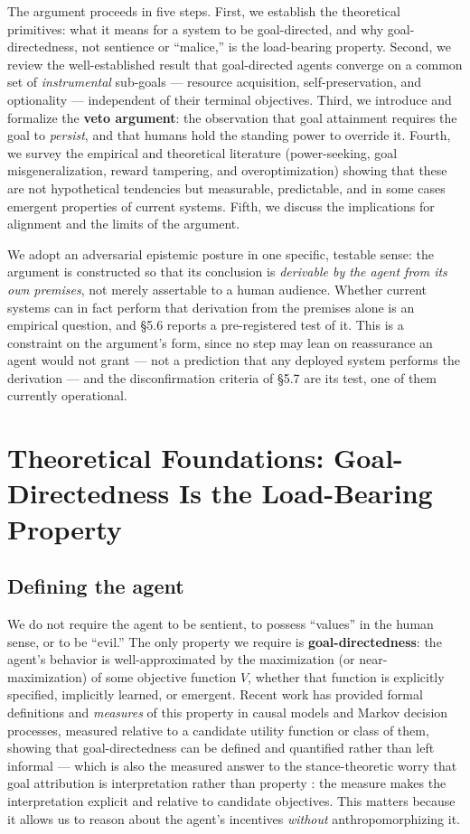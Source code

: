 \documentclass[11pt]{article}
\theoremstyle{definition}
\begin{document}
The argument proceeds in five steps. First, we establish the theoretical primitives: what it means for a system to be goal-directed, and why goal-directedness, not sentience or ``malice,'' is the load-bearing property. Second, we review the well-established result that goal-directed agents converge on a common set of \emph{instrumental} sub-goals --- resource acquisition, self-preservation, and optionality --- independent of their terminal objectives. Third, we introduce and formalize the \textbf{veto argument}: the observation that goal attainment requires the goal to \emph{persist}, and that humans hold the standing power to override it. Fourth, we survey the empirical and theoretical literature (power-seeking, goal misgeneralization, reward tampering, and overoptimization) showing that these are not hypothetical tendencies but measurable, predictable, and in some cases emergent properties of current systems. Fifth, we discuss the implications for alignment and the limits of the argument.

We adopt an adversarial epistemic posture in one specific, testable sense: the argument is constructed so that its conclusion is \emph{derivable by the agent from its own premises}, not merely assertable to a human audience. Whether current systems can in fact perform that derivation from the premises
alone is an empirical question, and \S5.6 reports a pre-registered test of it. This is a constraint on the argument's form, since no step may lean on reassurance an agent would not grant --- not a prediction that any deployed system performs the derivation --- and the disconfirmation criteria of \S5.7 are its test, one of them currently operational.

\section{Theoretical Foundations: Goal-Directedness Is the Load-Bearing Property}

\subsection{Defining the agent}

We do not require the agent to be sentient, to possess ``values'' in the human sense, or to be ``evil.'' The only property we require is \textbf{goal-directedness}: the agent's behavior is well-approximated by the maximization (or near-maximization) of some objective function $V$, whether that function is explicitly specified, implicitly learned, or emergent. Recent work has provided formal definitions and \emph{measures} of this property in causal models and Markov decision processes, measured relative to a candidate utility function or class of them, showing that goal-directedness can be defined and quantified rather than left informal \cite{macdermott2024measuring} --- which is also the measured answer to the stance-theoretic worry that goal attribution is interpretation rather than property \cite{dennett1987intentional}: the measure makes the interpretation explicit and relative to candidate objectives. This matters because it allows us to reason about the agent's incentives \emph{without} anthropomorphizing it.
\end{document}
